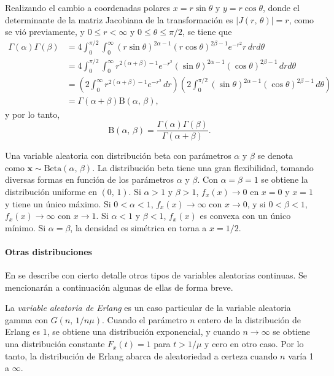 \documentclass[a4paper]{report}
\newcommand{\x}{\mathbf{x}}
\begin{document}
Realizando el cambio a coordenadas polares \(x=r\sin\theta\) y \(y=r\cos\theta\), donde el determinante de la matriz Jacobiana de la transformación es \(|J(r,\,\theta)|=r\), como se vió previamente, y \(0\leq r<\infty\) y \(0\leq\theta\leq\pi/2\), se tiene que 
\begin{align*}
 \Gamma(\alpha)\Gamma(\beta)&=4\int_0^{\pi/2}\int_{0}^{\infty}(r\sin\theta)^{2\alpha-1}(r\cos\theta)^{2\beta-1}e^{-r^2}r\,drd\theta\\
  &=4\int_0^{\pi/2}\int_{0}^{\infty}r^{2(\alpha+\beta)-1}e^{-r^2}(\sin\theta)^{2\alpha-1}(\cos\theta)^{2\beta-1}\,drd\theta\\
  &=\left(2\int_{0}^{\infty}r^{2(\alpha+\beta)-1}e^{-r^2}\,dr\right)\left(2\int_0^{\pi/2}(\sin\theta)^{2\alpha-1}(\cos\theta)^{2\beta-1}\,d\theta\right)\\
  &=\Gamma(\alpha+\beta)\mathrm{B}(\alpha,\,\beta),
\end{align*}
y por lo tanto,
\begin{equation}\label{eq:beta_function_as_gamma}
 \mathrm{B}(\alpha,\,\beta)=\frac{\Gamma(\alpha)\Gamma(\beta)}{\Gamma(\alpha+\beta)}. 
\end{equation}

Una variable aleatoria con distribución beta con parámetros \(\alpha\) y \(\beta\) se denota como \(\x\sim\mathrm{Beta}(\alpha,\,\beta)\). La distribución beta tiene una gran flexibilidad, tomando diversas formas en función de los parámetros 
\(\alpha\) y \(\beta\). Con \(\alpha=\beta=1\) se obtiene la distribución uniforme en \((0,\,1)\). Si \(\alpha>1\) y \(\beta>1\), \(f_x(x)\to0\) en \(x=0\) y \(x=1\) y tiene un único máximo. Si \(0<\alpha<1\), \(f_x(x)\to\infty\) con \(x\to0\), y si \(0<\beta<1\), \(f_x(x)\to\infty\) con \(x\to1\). Si \(\alpha<1\) y \(\beta<1\), \(f_x(x)\) es convexa con un único mínimo. Si \(\alpha=\beta\), la densidad es simétrica en torna a \(x=1/2\). 

\paragraph{Otras distribuciones}

En \cite{papoulis2002probability} se describe con cierto detalle otros tipos de variables aleatorias continuas. Se mencionarán a continuación algunas de ellas de forma breve. 

La \emph{variable aleatoria de Erlang} es un caso particular de la variable aleatoria gamma con \(G(n,\, 1/n\mu)\). Cuando el parámetro \(n\) entero de la distribución de Erlang es \(1\), se obtiene una distribución exponencial, y cuando \(n\to\infty\) se obtiene una distribución constante \(F_x(t)=1\) para \(t>1/\mu\) y cero en otro caso. Por lo tanto, la distribución de Erlang abarca  de aleatoriedad a certeza cuando \(n\) varía 1 a \(\infty\).
\end{document}
